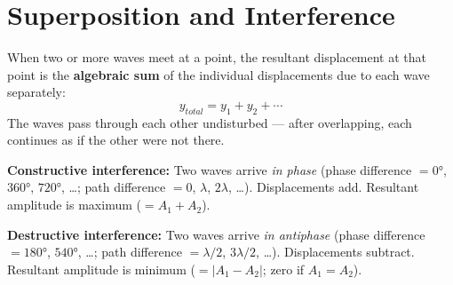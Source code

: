\section{Superposition and Interference}

\begin{lawbox}
When two or more waves meet at a point, the
resultant displacement at that point is the
\textbf{algebraic sum} of the individual
displacements due to each wave separately:
\[
  y_{total} = y_1 + y_2 + \cdots
\]
The waves pass through each other undisturbed ---
after overlapping, each continues as if the other
were not there.
\end{lawbox}

\begin{definitionbox}
\textbf{Constructive interference:} Two waves
arrive \textit{in phase} (phase difference $= 0°$,
$360°$, $720°$, \ldots; path difference $= 0$,
$\lambda$, $2\lambda$, \ldots). Displacements add.
Resultant amplitude is maximum ($= A_1 + A_2$).

\vspace{0.4cm}

\textbf{Destructive interference:} Two waves arrive
\textit{in antiphase} (phase difference $= 180°$,
$540°$, \ldots; path difference $= \lambda/2$,
$3\lambda/2$, \ldots). Displacements subtract.
Resultant amplitude is minimum ($= |A_1 - A_2|$;
zero if $A_1 = A_2$).
\end{definitionbox}

